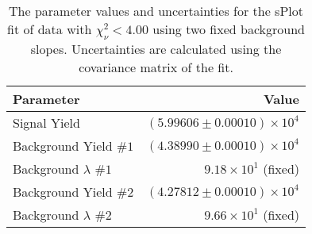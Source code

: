 
\begin{table}[ht]
    \begin{center}
        \begin{tabular}{lr}\toprule
            Parameter & Value \\\midrule
            Signal Yield & $(5.99606 \pm 0.00010) \times 10^{4}$ \\
            Background Yield $\#1$ & $(4.38990 \pm 0.00010) \times 10^{4}$ \\
            Background $\lambda$ $\#1$ & $9.18 \times 10^{1}$ (fixed) \\
            Background Yield $\#2$ & $(4.27812 \pm 0.00010) \times 10^{4}$ \\
            Background $\lambda$ $\#2$ & $9.66 \times 10^{1}$ (fixed) \\\bottomrule
        \end{tabular}
        \caption{The parameter values and uncertainties for the sPlot fit of data with $\chi^2_\nu < 4.00$ using two fixed background slopes. Uncertainties are calculated using the covariance matrix of the fit.}\label{tab:splot-fit-results-chisqdof-4.00-fixed-2}
    \end{center}
\end{table}
